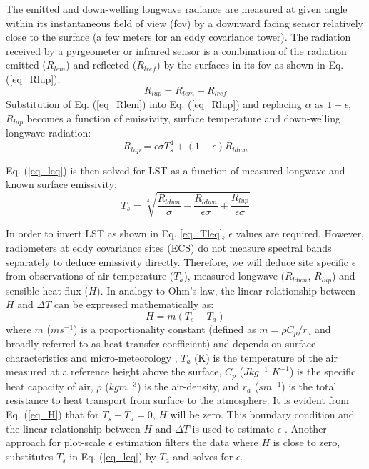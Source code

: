 \documentclass[fleqn,10pt]{wlscirep}
\begin{document}
The emitted and down-welling longwave radiance are measured at given angle within its instantaneous field of view (fov) by a downward facing sensor relatively close to the surface (a few meters for an eddy covariance tower). The radiation received by a pyrgeometer or infrared sensor is a combination of the radiation emitted ($R_{lem}$) and reflected ($R_{lref}$) by the surfaces in its fov as shown in Eq. (\ref{eq_Rlup}):
\begin{equation}\label{eq_Rlup}
R_{lup} = R_{lem} + R_{lref}
\end{equation}
Substitution of Eq. (\ref{eq_Rlem}) into Eq. (\ref{eq_Rlup}) and replacing  $\alpha$ as $1 - \epsilon$, $R_{lup}$ becomes a function of emissivity, surface temperature and down-welling longwave radiation:
\begin{equation}\label{eq_leq}
R_{lup}= \epsilon \sigma T_{s}^{4} + (1- \epsilon)R_{ldwn}
\end{equation}

Eq. (\ref{eq_leq}) is then solved for LST as a function of measured longwave and known surface emissivity:
\begin{equation}\label{eq_Tleq}
T_{s} = \sqrt[4]{\frac{R_{ldwn}}{\sigma} - \frac{R_{ldwn}}{\epsilon \sigma} + \frac{R_{lup}}{\epsilon \sigma}}
\end{equation}

In order to invert LST as shown in Eq. \eqref{eq_Tleq}, $\epsilon$ values are required. However, radiometers at eddy covariance sites (ECS) do not measure spectral bands separately to deduce emissivity directly. Therefore, we will deduce site specific $\epsilon$ from observations of air temperature ($T_a$), measured longwave ($R_{ldwn}$, $R_{lup}$) and sensible heat flux ($H$)\cite{holmes2016cloud}. In analogy to Ohm's law, the linear relationship between $H$ and $\Delta T$ can be expressed mathematically as:
\begin{equation}\label{eq_H}
H= m(T_{s} - T_{a})
\end{equation}
where  $m$ ($ms^{-1}$) is a proportionality constant (defined as $m=\rho C_{p}/r_{a}$ and broadly referred to as heat transfer coefficient) and depends on surface characteristics and micro-meteorology \cite{lhomme1988radiative}, $T_{a}$ (K) is the temperature of the air measured at a reference height above the surface, $C_{p}$ ($Jkg^{-1}$ $K^{-1}$) is the specific heat capacity of air, $\rho$ ($kgm^{-3}$) is the air-density, and $r_{a}$ ($sm^{-1}$) is the total resistance to heat transport from surface to the atmosphere. It is evident from Eq. (\ref{eq_H}) that for $T_{s} - T_{a} = 0$, $H$ will be zero. This boundary condition and the linear relationship  between $H$ and $\Delta T $ is used to estimate $\epsilon$ \cite{holmes2009land,holmes2016cloud}. Another approach for plot-scale $\epsilon$ estimation filters the data where $H$ is close to zero, substitutes $T_{s}$ in Eq. (\ref{eq_leq}) by $T_{a}$ and solves for $\epsilon$\cite{maes2019potential}. 
\end{document}
